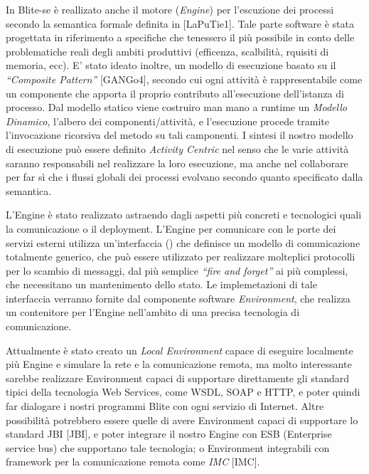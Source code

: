 In Blite-se è reallizato anche il motore (\emph{Engine}) per l'escuzione dei
processi secondo la semantica formale definita in [LaPuTie1]. Tale parte software
è stata progettata in riferimento a specifiche che tenessero il più possibile in
conto delle problematiche reali degli ambiti produttivi (efficenza, scalbilità,
rquisiti di memoria, ecc). E' stato ideato inoltre, un modello di esecuzione
basato su il \emph{``Composite Pattern''} [GANGo4], secondo cui ogni attività è
rappresentabile come un componente che apporta il proprio contributo
all'esecuzione dell'istanza di processo. Dal modello statico viene costruiro man
mano a runtime un \emph{Modello Dinamico}, l'albero dei componenti/attività, e
l'esecuzione procede tramite l'invocazione ricorsiva del metodo
 su tali camponenti. I sintesi il nostro modello di
esecuzione può essere definito \emph{Activity Centric} nel senso che le varie
attività saranno responsabili nel realizzare la loro esecuzione, ma anche nel
collaborare per far sì che i flussi globali dei processi evolvano secondo quanto
specificato dalla semantica.

L'Engine è stato realizzato astraendo dagli aspetti più concreti e
tecnologici quali la comunicazione o il deployment. L'Engine per comunicare con
le porte dei servizi esterni utilizza un'interfaccia () che
definisce un modello di comunicazione totalmente generico, che può essere
utilizzato per realizzare molteplici protocolli per lo scambio di messaggi, dal
più semplice \emph{``fire and forget''} ai più complessi, che necessitano un
mantenimento dello stato. Le implemetazioni di tale interfaccia verranno fornite
dal componente software \emph{Environment}, che realizza un contenitore per
l'Engine nell'ambito di una precisa tecnologia di comunicazione. 

Attualmente è stato creato un \emph{Local Environment} capace di eseguire
localmente più Engine e simulare la rete e la comunicazione remota, ma molto
interessante sarebbe realizzare Environment capaci di supportare direttamente gli
standard tipici della tecnologia Web Services, come WSDL, SOAP e HTTP, e poter
quindi far dialogare i nostri programmi Blite con ogni servizio di Internet.
Altre possibilità potrebbero essere quelle di avere Environment capaci
di supportare lo standard JBI [JBI], e poter integrare il nostro Engine con ESB
(Enterprise service bus) che supportano tale tecnologia; o Environment
integrabili con framework per la comunicazione remota come \emph{IMC} [IMC].
\\


